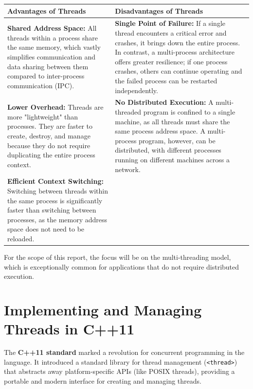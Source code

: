 \documentclass{article} %
\begin{document}
\begin{center}
\begin{tabular}{|p{}|p{}|}
\hline
\textbf{Advantages of Threads} & \textbf{Disadvantages of Threads} \\
\hline
\textbf{Shared Address Space:} All threads within a process share the same memory, which vastly simplifies communication and data sharing between them compared to inter-process communication (IPC). & \textbf{Single Point of Failure:} If a single thread encounters a critical error and crashes, it brings down the entire process. In contrast, a multi-process architecture offers greater resilience; if one process crashes, others can continue operating and the failed process can be restarted independently. \\
\hline
\textbf{Lower Overhead:} Threads are more "lightweight" than processes. They are faster to create, destroy, and manage because they do not require duplicating the entire process context. & \textbf{No Distributed Execution:} A multi-threaded program is confined to a single machine, as all threads must share the same process address space. A multi-process program, however, can be distributed, with different processes running on different machines across a network. \\
\hline
\textbf{Efficient Context Switching:} Switching between threads within the same process is significantly faster than switching between processes, as the memory address space does not need to be reloaded. & \\
\hline
\end{tabular}
\end{center}

For the scope of this report, the focus will be on the multi-threading model, which is exceptionally common for applications that do not require distributed execution.

\section{Implementing and Managing Threads in C++11}
The \textbf{C++11 standard} marked a revolution for concurrent programming in the language. It introduced a standard library for thread management (\texttt{<thread>}) that abstracts away platform-specific APIs (like POSIX threads), providing a portable and modern interface for creating and managing threads.
\end{document}
